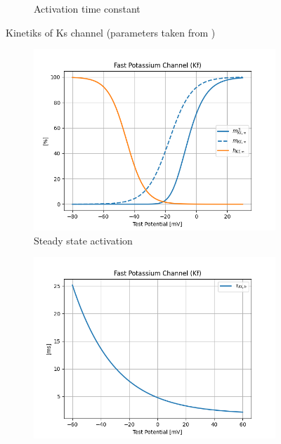 \documentclass[11pt]{article}
\begin{document}
\begin{figure}[H]
\begin{subfigure}[t]{0.48\textwidth}
        \caption{Activation time constant}
        \label{fig_ks_time_constant}
    \end{subfigure}

    \caption{Kinetiks of Ks channel (parameters taken from \parencite{gunayDistalSpikeInitiation2015})}
\end{figure}


\begin{figure}[H]
    \centering
    \begin{subfigure}[t]{0.48\textwidth}
        \centering
        \includegraphics[width=\textwidth]{./img/2025_01_23/Kf_steady_state_variables.png}
        \caption{Steady state activation}
        \label{fig_kf_steady_state_activation}
    \end{subfigure}
    \hfill
    \begin{subfigure}[t]{0.48\textwidth}
        \centering
        \includegraphics[width=\textwidth]{./img/2025_01_23/Kf_tau_h.png}

\end{subfigure}
\end{figure}
\end{document}
